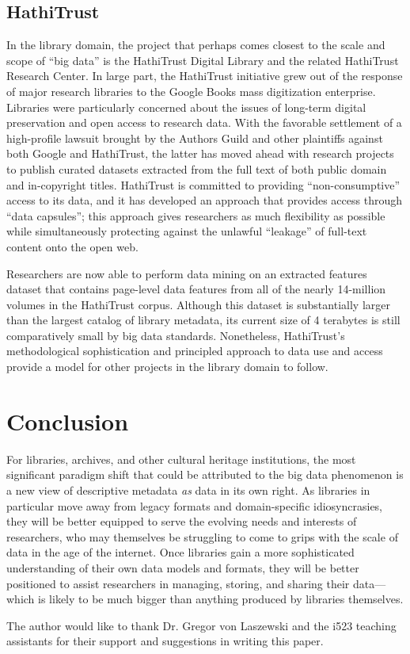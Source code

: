 \documentclass[sigconf]{acmart}
\begin{document}
\subsection{HathiTrust}
In the library domain, the project that perhaps comes closest to the scale and scope of ``big data'' is the HathiTrust Digital Library and the related HathiTrust Research Center. In large part, the HathiTrust initiative grew out of the response of major research libraries to the Google Books mass digitization enterprise\cite{hC10, bP13, jZ14}. Libraries were particularly concerned about the issues of long-term digital preservation and open access to research data. With the favorable settlement of a high-profile lawsuit brought by the Authors Guild and other plaintiffs against both Google and HathiTrust, the latter has moved ahead with research projects to publish curated datasets extracted from the full text of both public domain and in-copyright titles. HathiTrust is committed to providing ``non-consumptive'' access to its data, and it has developed an approach that provides access through ``data capsules''; this approach gives researchers as much flexibility as possible while simultaneously protecting against the unlawful ``leakage'' of full-text content onto the open web\cite{jZ14}.

Researchers are now able to perform data mining on an extracted features dataset that contains page-level data features from all of the nearly 14-million volumes in the HathiTrust corpus. Although this dataset is substantially larger than the largest catalog of library metadata, its current size of 4 terabytes is still comparatively small by big data standards\cite{hT17}. Nonetheless, HathiTrust's methodological sophistication and principled approach to data use and access provide a model for other projects in the library domain to follow.

\section{Conclusion}
For libraries, archives, and other cultural heritage institutions, the most significant paradigm shift that could be attributed to the big data phenomenon is a new view of descriptive metadata \textit{as} data in its own right. As libraries in particular move away from legacy formats and domain-specific idiosyncrasies, they will be better equipped to serve the evolving needs and interests of researchers, who may themselves be struggling to come to grips with the scale of data in the age of the internet. Once libraries gain a more sophisticated understanding of their own data models and formats, they will be better positioned to assist researchers in managing, storing, and sharing their data---which is likely to be much bigger than anything produced by libraries themselves.

\begin{acks}
The author would like to thank Dr. Gregor von Laszewski and the i523 teaching assistants for their support and suggestions in writing this paper.
\end{acks}


 


\end{document}
